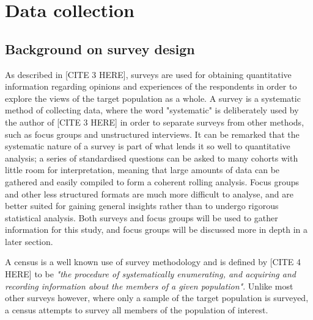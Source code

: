 \chapter{Data collection}

\section{Background on survey design}



As described in [CITE 3 HERE], surveys are used for obtaining quantitative information regarding opinions and 
experiences of the respondents in order to explore the views of the target population as a whole. A survey is a systematic
method of collecting data, where the word "systematic" is deliberately used by the author of [CITE 3 HERE] in order to separate
surveys from other methods, such as focus groups and unstructured interviews. It can be remarked that the systematic nature of
a survey is part of what lends it so well to quantitative analysis; a series of standardised questions can be asked to many
cohorts with little room for interpretation, meaning that large amounts of data can be gathered and easily compiled to
form a coherent rolling analysis. Focus groups and other less structured formats are much more difficult to analyse, and are
better suited for gaining general insights rather than to undergo rigorous statistical analysis. Both surveys and focus groups
will be used to gather information for this study, and focus groups will be discussed more in depth in a later section.

A census is a well known use of survey methodology and is defined by [CITE 4 HERE] to be \textit{"the procedure of systematically 
enumerating, and acquiring and recording information about the members of a given population"}. Unlike most other surveys however, 
where only a sample of the target population is surveyed, a census attempts to survey all members of the population of 
interest. %


